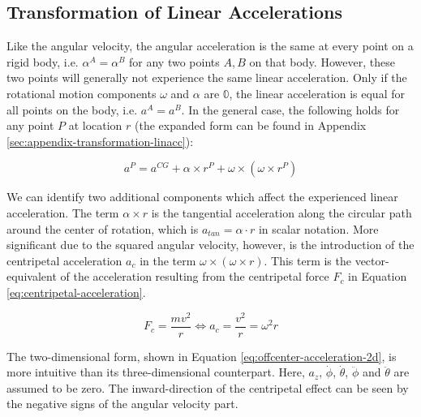 \subsection{Transformation of Linear Accelerations}
Like the angular velocity, the angular acceleration is the same at every point on a rigid body, i.e. $\alpha^A = \alpha^B$ for any two points $A, B$ on that body. However, these two points will generally not experience the same linear acceleration. Only if the rotational motion components $\omega$ and $\alpha$ are $\mathbb{0}$, the linear acceleration is equal for all points on the body, i.e. $a^A = a^B$. In the general case, the following holds for any point $P$ at location $r$ (the expanded form can be found in Appendix \ref{sec:appendix-transformation-linacc}):

\begin{equation}\label{eq:offcenter-acceleration-3d}%
a^P = a^{CG} + \alpha \times r^P + \omega \times (\omega \times r^P)%
\end{equation}

We can identify two additional components which affect the experienced linear acceleration. The term $\alpha \times r$ is the tangential acceleration along the circular path around the center of rotation, which is $a_{tan} = \alpha \cdot r$ in scalar notation. More significant due to the squared angular velocity, however, is the introduction of the centripetal acceleration $a_c$ in the term $\omega \times (\omega \times r)$. This term is the vector-equivalent of the acceleration resulting from the centripetal force $F_c$ in Equation \ref{eq:centripetal-acceleration}.

\begin{equation}\label{eq:centripetal-acceleration}%
F_c = \frac{mv^2}{r} \iff a_c = \frac{v^2}{r} = \omega^2 r%
\end{equation}

The two-dimensional form, shown in Equation \ref{eq:offcenter-acceleration-2d}, is more intuitive than its three-dimensional counterpart. Here, $a_z$, $\dot{\phi}$, $\dot{\theta}$, $\ddot{\phi}$ and $\ddot{\theta}$ are assumed to be zero. The inward-direction of the centripetal effect can be seen by the negative signs of the angular velocity part.

